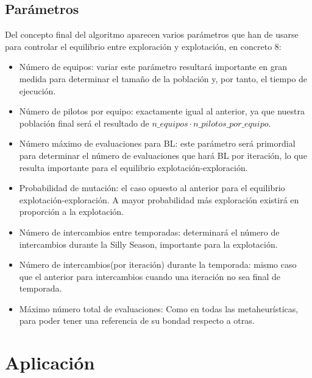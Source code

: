 \documentclass{article}
\begin{document}
	\subsection{Parámetros}
	Del concepto final del algoritmo aparecen varios parámetros que han de usarse para controlar el equilibrio entre exploración y explotación, en concreto 8:
	\begin{itemize}
		\item Número de equipos: variar este parámetro resultará importante en gran medida para determinar el tamaño de la población y, por tanto, el tiempo de ejecución.
		\item Número de pilotos por equipo: exactamente igual al anterior, ya que nuestra población final será el resultado de $n\_equipos\cdot n\_pilotos\_por\_equipo$.
		\item Número máximo de evaluaciones para BL: este parámetro será primordial para determinar el número de evaluaciones que hará BL por iteración, lo que resulta importante para el equilibrio explotación-exploración.
		\item Probabilidad de mutación: el caso opuesto al anterior para el equilibrio explotación-exploración. A mayor probabilidad más exploración existirá en proporción a la explotación.
		\item Número de intercambios entre temporadas: determinará el número de intercambios durante la Silly Season, importante para la explotación.
		\item Número de intercambios(por iteración) durante la temporada: mismo caso que el anterior para intercambios cuando una iteración no sea final de temporada.
		\item Máximo número total de evaluaciones: Como en todas las metaheurísticas, para poder tener una referencia de su bondad respecto a otras.
	\end{itemize}
	
	\section{Aplicación}
\end{document}
